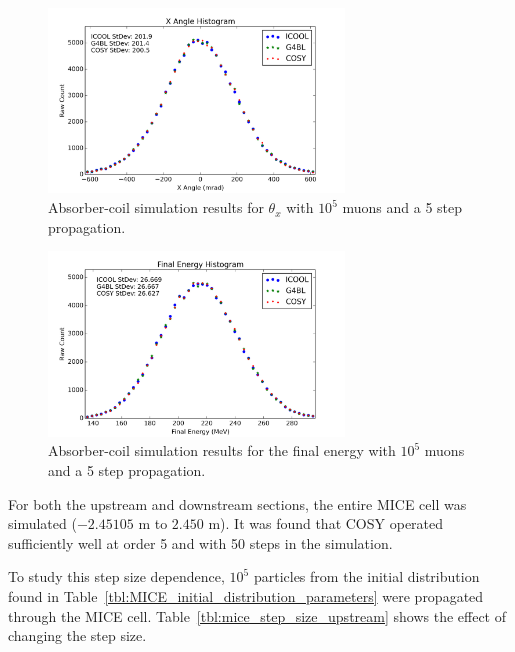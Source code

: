 \begin{figure}[H]
  \centering
    \includegraphics[width=0.7\textwidth]{MICE data/absorber coils/px} 
  \caption{Absorber-coil simulation results for $\theta_x$ with $10^5$ muons and a 5 step propagation.}
  \label{fig:acpx}
\end{figure}

\begin{figure}[H]
  \centering
    \includegraphics[width=0.7\textwidth]{MICE data/absorber coils/e} 
  \caption{Absorber-coil simulation results for the final energy with $10^5$ muons and a 5 step propagation.}
  \label{fig:ace}
\end{figure}

For both the upstream and downstream sections, the entire MICE cell was simulated ($-2.45105$ m to $2.450$ m). It was found that COSY operated sufficiently well at order 5 and with 50 steps in the simulation.

To study this step size dependence, $10^5$ particles from the initial distribution found in Table~\ref{tbl:MICE_initial_distribution_parameters} were propagated through the MICE cell. Table~\ref{tbl:mice_step_size_upstream} shows the effect of changing the step size.

